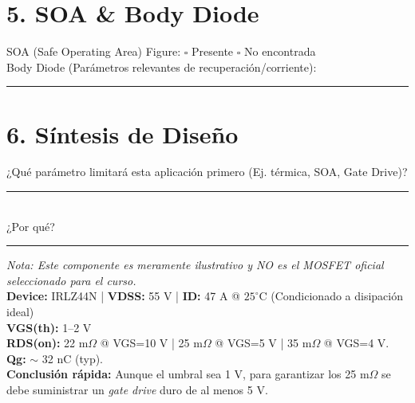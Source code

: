 \documentclass[11pt, a4paper]{article}
\begin{document}
\section*{5. SOA \& Body Diode}
SOA (Safe Operating Area) Figure: $\square$ Presente \quad $\square$ No encontrada \\
Body Diode (Parámetros relevantes de recuperación/corriente): \rule{6cm}{0.4pt}

\section*{6. Síntesis de Diseño}
¿Qué parámetro limitará esta aplicación primero (Ej. térmica, SOA, Gate Drive)? \rule{4.5cm}{0.4pt} \\
¿Por qué? \rule{13.5cm}{0.4pt}

\vfill
\begin{tcolorbox}[colback=yellow!10, colframe=gray, title=Ejemplo Ilustrativo Guiado (IRLZ44N - Infineon)]
    \small \textit{Nota: Este componente es meramente ilustrativo y NO es el MOSFET oficial seleccionado para el curso.} \\
    \textbf{Device:} IRLZ44N | \textbf{VDSS:} 55 V | \textbf{ID:} 47 A @ $25^\circ$C (Condicionado a disipación ideal) \\
    \textbf{VGS(th):} 1--2 V \\
    \textbf{RDS(on):} 22 m$\Omega$ @ VGS=10 V | 25 m$\Omega$ @ VGS=5 V | 35 m$\Omega$ @ VGS=4 V. \\
    \textbf{Qg:} $\sim$ 32 nC (typ). \\
    \textbf{Conclusión rápida:} Aunque el umbral sea 1 V, para garantizar los 25 m$\Omega$ se debe suministrar un \textit{gate drive} duro de al menos 5 V.
\end{tcolorbox}
\end{document}
